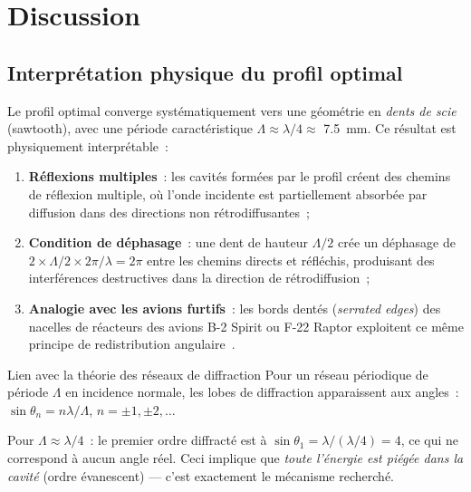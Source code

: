 \documentclass[12pt,a4paper]{article}
\begin{document}
\section{Discussion}
\label{sec:discussion}

\subsection{Interprétation physique du profil optimal}

Le profil optimal converge systématiquement vers une géométrie en \textit{dents de scie}
(sawtooth), avec une période caractéristique $\Lambda \approx \lambda/4 \approx$
\SI{7.5}{\milli\metre}. Ce résultat est physiquement interprétable~:

\begin{enumerate}
    \item \textbf{Réflexions multiples}~: les cavités formées par le profil créent des
          chemins de réflexion multiple, où l'onde incidente est partiellement absorbée
          par diffusion dans des directions non rétrodiffusantes~;
    \item \textbf{Condition de déphasage}~: une dent de hauteur $\Lambda/2$ crée un
          déphasage de $2 \times \Lambda/2 \times 2\pi/\lambda = 2\pi$ entre les
          chemins directs et réfléchis, produisant des interférences destructives
          dans la direction de rétrodiffusion~;
    \item \textbf{Analogie avec les avions furtifs}~: les bords dentés (\textit{serrated edges})
          des nacelles de réacteurs des avions B-2 Spirit ou F-22 Raptor exploitent
          ce même principe de redistribution angulaire~\cite{Knott1993}.
\end{enumerate}

\begin{remarque}{Lien avec la théorie des réseaux de diffraction}
Pour un réseau périodique de période $\Lambda$ en incidence normale, les lobes de
diffraction apparaissent aux angles~:
$\sin\theta_n = n\lambda/\Lambda$, $n = \pm1, \pm2, \ldots$

Pour $\Lambda \approx \lambda/4$~: le premier ordre diffracté est à
$\sin\theta_1 = \lambda/(\lambda/4) = 4$, ce qui ne correspond à aucun angle réel.
Ceci implique que \textit{toute l'énergie est piégée dans la cavité} (ordre évanescent) —
c'est exactement le mécanisme recherché.
\end{remarque}
\end{document}

